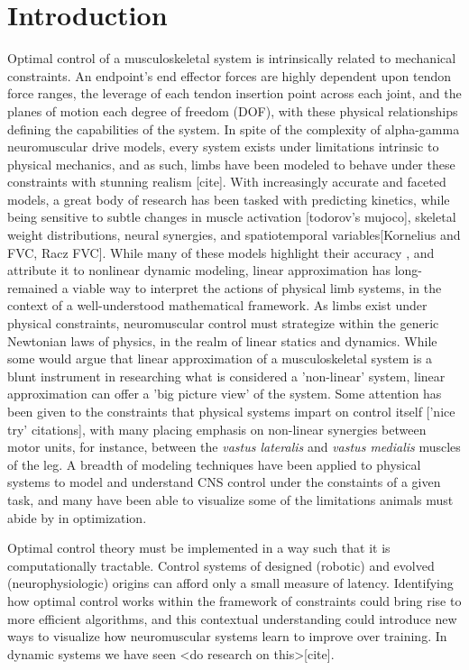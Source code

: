 \section{Introduction}

Optimal control of a musculoskeletal system is intrinsically related to mechanical constraints. 
An endpoint's end effector forces are highly dependent upon tendon force ranges, the leverage of each tendon insertion point across each joint, and the planes of motion each degree of freedom (DOF), with these physical relationships defining the capabilities of the system.
In spite of the complexity of alpha-gamma neuromuscular drive models, every system exists under limitations intrinsic to physical mechanics, and as such, limbs have been modeled to behave under these constraints with stunning realism [cite]. With increasingly accurate and faceted models, a great body of research has been tasked with predicting kinetics, while being sensitive to subtle changes in muscle activation [todorov's mujoco], skeletal weight distributions, neural synergies, and spatiotemporal variables[Kornelius and FVC, Racz FVC].
While many of these models highlight their accuracy , and attribute it to nonlinear dynamic modeling, linear approximation has long-remained a viable way to interpret the actions of physical limb systems, in the context of a well-understood mathematical framework.
As limbs exist under physical constraints, neuromuscular control must strategize within the generic Newtonian laws of physics, in the realm of linear statics and dynamics.
While some would argue that linear approximation of a musculoskeletal system is a blunt instrument in researching what is considered a 'non-linear' system, linear approximation can offer a 'big picture view' of the system.
Some attention has been given to the constraints that physical systems impart on control itself ['nice try' citations], with many placing emphasis on non-linear synergies between motor units, for instance, between the \textit{vastus lateralis} and \textit{vastus medialis} muscles of the leg.
A breadth of modeling techniques have been applied to physical systems to model and understand CNS control under the constaints of a given task, and many have been able to visualize some of the limitations animals must abide by in optimization.

Optimal control theory must be implemented in a way such that it is computationally tractable. Control systems of designed (robotic) and evolved (neurophysiologic) origins can afford only a small measure of latency.
Identifying how optimal control works within the framework of constraints could bring rise to more efficient algorithms, and this contextual understanding could introduce new ways to visualize how neuromuscular systems learn to improve over training.
In dynamic systems we have seen <do research on this>[cite].

